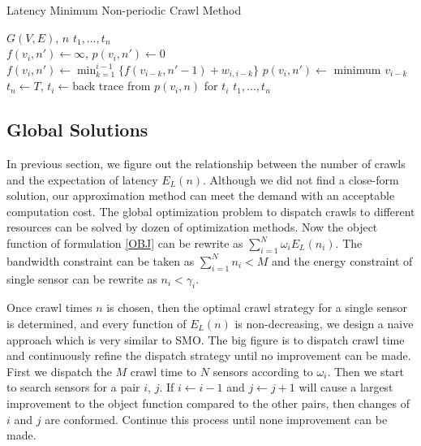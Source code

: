 \documentclass[conference]{IEEEtran}
\begin{document}
\begin{algorithm}
\caption{Latency Minimum Non-periodic Crawl Method}
  \label{alg:dp_min}
  \begin{algorithmic}[1]
  \renewcommand{\algorithmicrequire}{\textbf{Input:}}
  \renewcommand{\algorithmicensure}{\textbf{Output:}}
  \REQUIRE $G(V,E)$, $n$
  \ENSURE  $t_1,\ldots,t_n$
  \\
  \STATE $f(v_i,n') \gets \infty$, $p(v_i,n')\gets 0$
      \STATE $f(v_i,n')\gets\min_{k=1}^{i-1}\{f(v_{i-k}, n'-1)+w_{i,i-k}\}$
      \STATE $p(v_i,n')\gets$ minimum $v_{i-k}$
    \ENDFOR
  \ENDFOR
  \STATE $t_n\gets T$, $t_i\gets$back trace from $p(v_i, n)$ for $t_i$
  \RETURN $t_1,\ldots,t_n$
  \end{algorithmic}
\end{algorithm}

\subsection{Global Solutions}
In previous section, we figure out the relationship between the number of crawls and the expectation of latency $E_L(n)$. Although we did not find a close-form solution, our approximation method can meet the demand with an acceptable computation cost. The global optimization problem to dispatch crawls to different resources can be solved by dozen of optimization methods.
Now the object function of formulation \ref{OBJ} can be rewrite as $\sum_{i=1}^{N} \omega_i E_L(n_i)$. The bandwidth constraint can be taken as $\sum_{i=1}^{N} n_i < M$ and the energy constraint of single sensor can be rewrite as $n_i<\gamma_i$.


Once crawl times $n$ is chosen, then the optimal crawl strategy for a single sensor is determined, and every function of $E_L(n)$ is non-decreasing,  we design a naive approach which is very similar to SMO\cite{Platt1998}. 
The big figure is to dispatch crawl time and continuously refine the dispatch strategy until no improvement can be made.
First we dispatch the $M$ crawl time to $N$ sensors according to $\omega_i$. Then we start to search sensors for a pair $i$, $j$. If $i\gets i-1$ and $j\gets j+1$ will cause a largest improvement to the object function compared to the other pairs, then changes of $i$ and $j$ are conformed. Continue this process until none improvement can be made.
\end{document}
